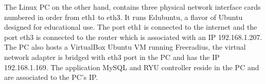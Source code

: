 The Linux PC on the other hand, contains three physical network interface cards numbered in order from eth1 to eth3. It runs Edubuntu, a flavor of Ubuntu designed for educational use. The port eth1 is connected to the internet and the port eth3 is connected to the router which is associated with an IP 192.168.1.207. The PC also hosts a VirtualBox Ubuntu VM running Freeradius, the virtual network adapter is bridged with eth3 port in the PC and has the IP 192.168.1.169. The application MySQL and RYU controller reside in the PC and are associated to the PC’s IP.
%	


